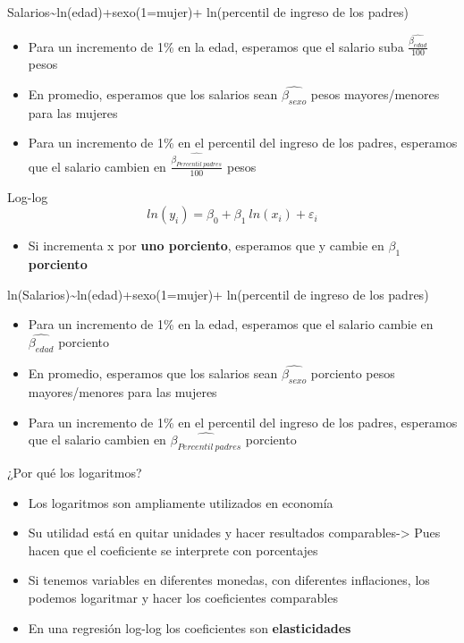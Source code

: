\documentclass[
  ignorenonframetext,
]{beamer}
\providecommand{\tightlist}{%
  \setlength{\itemsep}{0pt}\setlength{\parskip}{0pt}}
\begin{document}
\begin{frame}{}
\protect\hypertarget{section-49}{}
Salarios\textasciitilde ln(edad)+sexo(1=mujer)+ ln(percentil de ingreso
de los padres)

\begin{itemize}
\item
  Para un incremento de 1\% en la edad, esperamos que el salario suba
  \(\frac{\hat{\beta_{edad}}}{100}\) pesos
\item
  En promedio, esperamos que los salarios sean \(\hat{\beta_{sexo}}\)
  pesos mayores/menores para las mujeres
\item
  Para un incremento de 1\% en el percentil del ingreso de los padres,
  esperamos que el salario cambien en
  \(\frac{\hat{\beta_{Percentil \ padres}}}{100}\) pesos
\end{itemize}
\end{frame}

\begin{frame}{Log-log}
\protect\hypertarget{log-log}{}
\[ln(y_i)=\beta_0+\beta_1 \ ln(x_i) +\varepsilon_i\]

\begin{itemize}
\tightlist
\item
  Si incrementa x por \textbf{uno porciento}, esperamos que y cambie en
  \(\beta_1\) \textbf{porciento}
\end{itemize}
\end{frame}

\begin{frame}{}
\protect\hypertarget{section-50}{}
ln(Salarios)\textasciitilde ln(edad)+sexo(1=mujer)+ ln(percentil de
ingreso de los padres)

\begin{itemize}
\item
  Para un incremento de 1\% en la edad, esperamos que el salario cambie
  en \(\hat{\beta_{edad}}\) porciento
\item
  En promedio, esperamos que los salarios sean \(\hat{\beta_{sexo}}\)
  porciento pesos mayores/menores para las mujeres
\item
  Para un incremento de 1\% en el percentil del ingreso de los padres,
  esperamos que el salario cambien en
  \(\hat{\beta_{Percentil \ padres}}\) porciento
\end{itemize}
\end{frame}

\begin{frame}{¿Por qué los logaritmos?}
\protect\hypertarget{por-quuxe9-los-logaritmos}{}
\begin{itemize}
\tightlist
\item
  Los logaritmos son ampliamente utilizados en economía
\item
  Su utilidad está en quitar unidades y hacer resultados
  comparables-\textgreater{} Pues hacen que el coeficiente se interprete
  con porcentajes
\item
  Si tenemos variables en diferentes monedas, con diferentes
  inflaciones, los podemos logaritmar y hacer los coeficientes
  comparables
\item
  En una regresión log-log los coeficientes son \textbf{elasticidades}
\end{itemize}
\end{frame}
\end{document}

